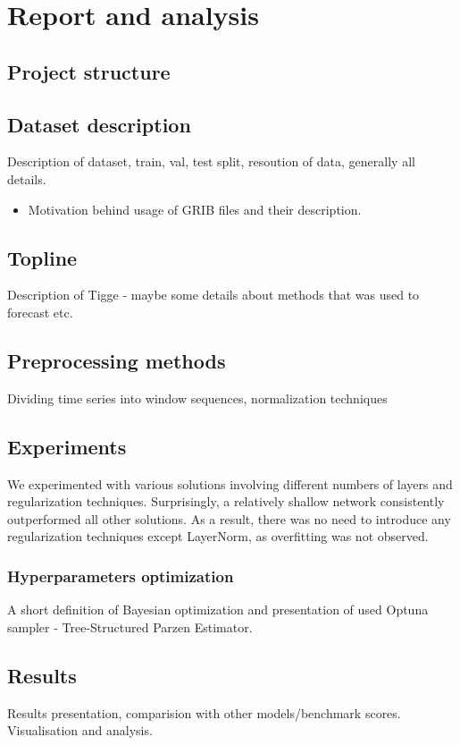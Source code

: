 \chapter{Report and analysis}\label{chap:report}

\section{Project structure}


\section{Dataset description}\label{chap:dataset}
Description of dataset, train, val, test split, resoution of data, generally all details.
\begin{itemize}
    \item Motivation behind usage of GRIB files and their description.
\end{itemize}

\section{Topline}
Description of Tigge - maybe some details about methods that was used to forecast etc.
\section{Preprocessing methods}
Dividing time series into window sequences, normalization techniques

\section{Experiments}
We experimented with various solutions involving different numbers of layers and regularization techniques. Surprisingly, a relatively shallow network consistently outperformed all other solutions. As a result, there was no need to introduce any regularization techniques except LayerNorm, as overfitting was not observed.

\subsection{Hyperparameters optimization}
A short definition of Bayesian optimization and presentation of used Optuna sampler - Tree-Structured Parzen Estimator.~\cite{watanabe2023treestructured} 

\section{Results}
Results presentation, comparision with other models/benchmark scores. Visualisation and analysis.


